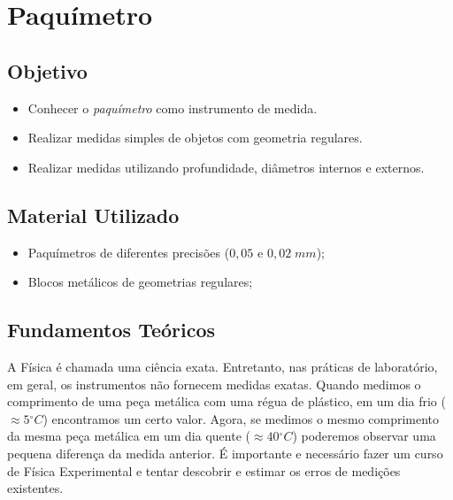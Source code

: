 \chapter{Paquímetro}

\section{Objetivo}
\begin{itemize}
\item Conhecer o \emph{paquímetro} como instrumento de medida.
\item Realizar medidas simples de objetos com geometria regulares.
\item Realizar medidas utilizando profundidade, diâmetros internos e externos.
\end{itemize}





\section{Material Utilizado}

\begin{itemize}
	\item Paquímetros de diferentes precisões ($0,05$ e $0,02\;mm$);
	\item Blocos metálicos de geometrias regulares;
\end{itemize}%





\section{Fundamentos Teóricos}

A Física é chamada uma ciência exata. Entretanto, nas práticas de laboratório, em geral, os instrumentos não fornecem medidas exatas.
Quando medimos o comprimento de uma peça metálica com uma régua de plástico, em um dia frio ($\approx 5 {^\circ C}$) encontramos um certo valor.
Agora, se medimos o mesmo comprimento da mesma peça metálica em um dia quente ($\approx 40 {^\circ C}$) poderemos observar uma pequena diferença da medida anterior.
É importante e necessário fazer um curso de Física Experimental e tentar descobrir e estimar os erros de medições existentes.

